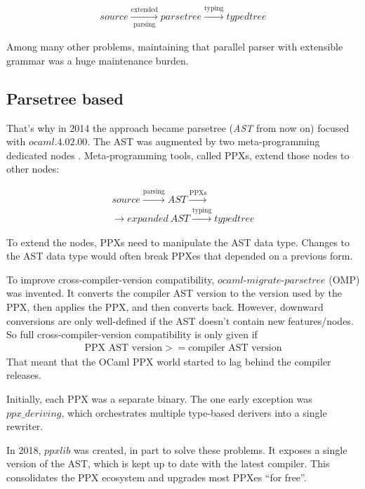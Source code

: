 \documentclass[10pt, a4paper, twocolumn]{article}
\begin{document}
\begin{align*}
source \xrightarrow[\text{parsing}]{\text{extended}} parsetree \xrightarrow{\text{typing}} typedtree
\end{align*}

Among many other problems, maintaining that parallel parser with extensible
grammar was a huge maintenance burden.


\subsection{Parsetree based}

That's why in 2014 the approach became parsetree (\emph{AST} from now on)
focused with $ocaml.4.02.00$. The AST was augmented by two meta-programming
dedicated nodes \cite{extension_nodes}\cite{attributes}. Meta-programming tools,
called PPXs, extend those nodes to other nodes:

\begin{gather*}
source \xrightarrow{\text{parsing}} AST \xrightarrow{\text{PPXs}}\\
\rightarrow expanded\ AST\xrightarrow{\text{typing}} typedtree
\end{gather*}

To extend the nodes, PPXs need to manipulate the AST data type. Changes to the
AST data type would often break PPXes that depended on a previous form.

To improve cross-compiler-version compatibility, $ocaml\mbox{-}migrate\mbox{-}parsetree$
(OMP)\cite{omp} was invented. It converts the compiler AST version to the
version used by the PPX, then applies the PPX, and then converts back. However,
downward conversions are only well-defined if the AST doesn't contain new
features/nodes. So full cross-compiler-version compatibility is only given if
\begin{align*}
\text{PPX\ AST\ version} >= \text{compiler\ AST\ version}
\end{align*}
That meant that the OCaml PPX world started to lag behind the compiler releases.

Initially, each PPX was a separate binary. The one early exception was $ppx \_
deriving$, which orchestrates multiple type-based derivers into a single
rewriter.

In 2018, $ppxlib$\cite{ppxlib} was created, in part to solve these problems. It
exposes a single version of the AST, which is kept up to date with the latest
compiler. This consolidates
the PPX ecosystem and upgrades most PPXes ``for free''.
\end{document}
